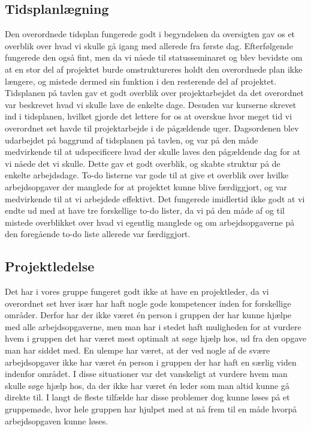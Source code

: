 \subsection{Tidsplanlægning}
Den overordnede tidsplan fungerede godt i begyndelsen da oversigten gav os et overblik over hvad vi skulle gå igang med allerede fra første dag. Efterfølgende fungerede den også fint, men da vi nåede til statusseminaret og blev bevidste om at en stor del af projektet burde omstruktureres holdt den overordnede plan ikke længere, og mistede dermed sin funktion i den resterende del af projektet. 
Tidsplanen på tavlen gav et godt overblik over projektarbejdet da det overordnet var beskrevet hvad vi skulle lave de enkelte dage. Desuden var kurserne skrevet ind i tidsplanen, hvilket gjorde det lettere for os at overskue hvor meget tid vi overordnet set havde til projektarbejde i de pågældende uger. 
Dagsordenen blev udarbejdet på baggrund af tidsplanen på tavlen, og var på den måde medvirkende til at udspecificere hvad der skulle laves den pågældende dag for at vi nåede det vi skulle. Dette gav et godt overblik, og skabte struktur på de enkelte arbejdsdage.
To-do listerne var gode til at give et overblik over hvilke arbejdsopgaver der manglede for at projektet kunne blive færdiggjort, og var medvirkende til at vi arbejdede effektivt. Det fungerede imidlertid ikke godt at vi endte ud med at have tre forskellige to-do lister, da vi på den måde af og til mistede overblikket over hvad vi egentlig manglede og om arbejdsopgaverne på den foregående to-do liste allerede var færdiggjort.

\subsection{Projektledelse}
Det har i vores gruppe fungeret godt ikke at have en projektleder, da vi overordnet set hver især har haft nogle gode kompetencer inden for forskellige områder. Derfor har der ikke været én person i gruppen der har kunne hjælpe med alle arbejdsopgaverne, men man har i stedet haft muligheden for at vurdere hvem i gruppen det har været mest optimalt at søge hjælp hos, ud fra den opgave man har siddet med. 
En ulempe har været, at der ved nogle af de svære arbejdsopgaver ikke har været én person i gruppen der har haft en særlig viden indenfor området. I disse situationer var det vanskeligt at vurdere hvem man skulle søge hjælp hos, da der ikke har været én leder som man altid kunne gå direkte til. I langt de fleste tilfælde har disse problemer dog kunne løses på et gruppemøde, hvor hele gruppen har hjulpet med at nå frem til en måde hvorpå arbejdsopgaven kunne løses.

